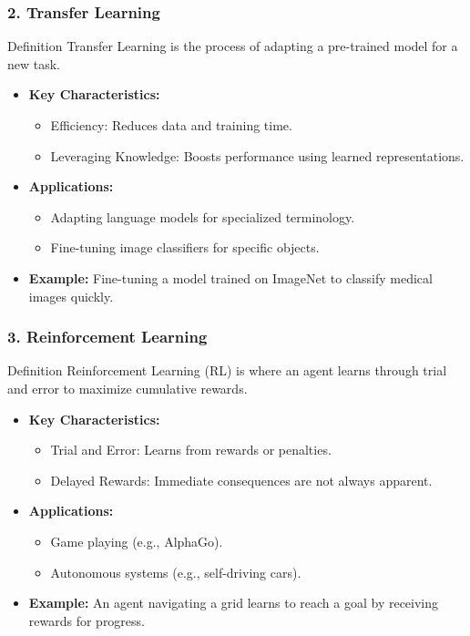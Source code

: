 \documentclass[aspectratio=169]{beamer}
\begin{document}
\begin{frame}[fragile]
    \frametitle{2. Transfer Learning}
    \begin{block}{Definition}
        Transfer Learning is the process of adapting a pre-trained model for a new task.
    \end{block}
    \begin{itemize}
        \item \textbf{Key Characteristics:}
        \begin{itemize}
            \item Efficiency: Reduces data and training time.
            \item Leveraging Knowledge: Boosts performance using learned representations.
        \end{itemize}
        
        \item \textbf{Applications:}
        \begin{itemize}
            \item Adapting language models for specialized terminology.
            \item Fine-tuning image classifiers for specific objects.
        \end{itemize}

        \item \textbf{Example:} 
        Fine-tuning a model trained on ImageNet to classify medical images quickly.
    \end{itemize}
\end{frame}

\begin{frame}[fragile]
    \frametitle{3. Reinforcement Learning}
    \begin{block}{Definition}
        Reinforcement Learning (RL) is where an agent learns through trial and error to maximize cumulative rewards.
    \end{block}
    \begin{itemize}
        \item \textbf{Key Characteristics:}
        \begin{itemize}
            \item Trial and Error: Learns from rewards or penalties.
            \item Delayed Rewards: Immediate consequences are not always apparent.
        \end{itemize}
        
        \item \textbf{Applications:}
        \begin{itemize}
            \item Game playing (e.g., AlphaGo).
            \item Autonomous systems (e.g., self-driving cars).
        \end{itemize}

        \item \textbf{Example:} 
        An agent navigating a grid learns to reach a goal by receiving rewards for progress.
    \end{itemize}
\end{frame}
\end{document}
